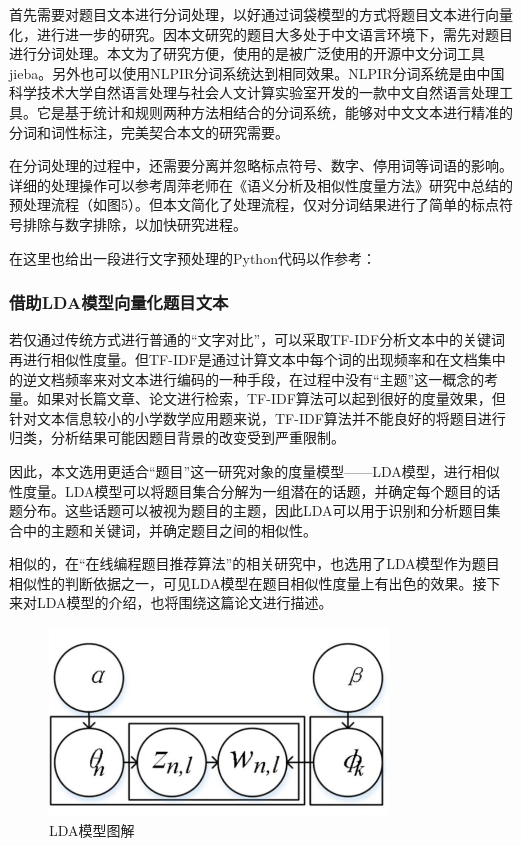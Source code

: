 首先需要对题目文本进行分词处理，以好通过词袋模型的方式将题目文本进行向量化，进行进一步的研究。因本文研究的题目大多处于中文语言环境下，需先对题目进行分词处理。本文为了研究方便，使用的是被广泛使用的开源中文分词工具jieba。另外也可以使用NLPIR分词系统达到相同效果。NLPIR分词系统是由中国科学技术大学自然语言处理与社会人文计算实验室开发的一款中文自然语言处理工具。它是基于统计和规则两种方法相结合的分词系统，能够对中文文本进行精准的分词和词性标注，完美契合本文的研究需要。

在分词处理的过程中，还需要分离并忽略标点符号、数字、停用词等词语的影响。详细的处理操作可以参考周萍老师在《语义分析及相似性度量方法》\cite{ZhouJiYuYuYiFenXiDeWenBenXiangSiXingDuLiangYanJiuJiYingYong2017}研究中总结的预处理流程（如图5）。但本文简化了处理流程，仅对分词结果进行了简单的标点符号排除与数字排除，以加快研究进程。

在这里也给出一段进行文字预处理的Python代码以作参考：

\begin{mgCodeBlock}
\end{mgCodeBlock}

\subsubsection{借助LDA模型向量化题目文本}

若仅通过传统方式进行普通的“文字对比”，可以采取TF-IDF分析文本中的关键词再进行相似性度量。但TF-IDF是通过计算文本中每个词的出现频率和在文档集中的逆文档频率来对文本进行编码的一种手段，在过程中没有“主题”这一概念的考量。如果对长篇文章、论文进行检索，TF-IDF算法可以起到很好的度量效果，但针对文本信息较小的小学数学应用题来说，TF-IDF算法并不能良好的将题目进行归类，分析结果可能因题目背景的改变受到严重限制。

因此，本文选用更适合“题目”这一研究对象的度量模型——LDA模型，进行相似性度量。LDA模型可以将题目集合分解为一组潜在的话题，并确定每个题目的话题分布。这些话题可以被视为题目的主题，因此LDA可以用于识别和分析题目集合中的主题和关键词，并确定题目之间的相似性。

相似的，在“在线编程题目推荐算法”的相关研究中\cite{LuoRongHeZhiShiDianYuTuJuanJiDeZaiXianBianChengTiMuTuiJianSuanFa}，也选用了LDA模型作为题目相似性的判断依据之一，可见LDA模型在题目相似性度量上有出色的效果。接下来对LDA模型的介绍，也将围绕这篇论文进行描述。

\begin{figure}[htbp]
    \centering
    \label{photo041942}
    \includegraphics[width=9cm,height=5cm]{res/LDA.jpg}
    \caption{LDA模型图解}
\end{figure} 

